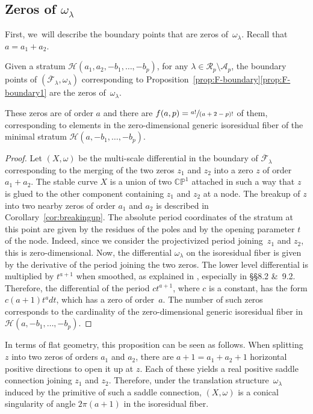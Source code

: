 \subsection{Zeros of $\omega_{\lambda}$}\label{subsub:zeros}

First, we~will describe the boundary points that are zeros of~$\omega_{\lambda}$. Recall that $a=a_{1}+a_{2}$.
\begin{prop}\label{prop:zeros}
Given a stratum $\mathcal{H}(a_{1},a_{2},-b_{1},\dots,-b_{p})$, for any $\lambda \in \mathcal{R}_{p} \setminus \mathcal{A}_{p}$, the boundary points of $(\overline{\mathcal{F}}_{\lambda}, \omega_\lambda)$ corresponding to Proposition~\ref{prop:F-boundary}\eqref{prop:F-boundary1} are the zeros of~$\omega_{\lambda}$.

These zeros are of order $a$ and there are $f(a,p)=\sfrac{a!}{(a+2-p)!}$ of them, corresponding to elements in the zero-dimensional generic isoresidual fiber of the minimal stratum $\mathcal{H}(a,-b_{1},\dots,-b_{p})$.
\end{prop}

\begin{proof}
Let $(X,\omega)$ be the multi-scale differential in the boundary of $\overline{\mathcal F}_\lambda$ corresponding to the merging of the two zeros $z_1$ and $z_2$ into a zero $z$ of order $a_1 + a_2$. The stable curve $X$ is a union of two $\mathbb{CP}^1$ attached in such a way that $z$ is glued to the other component containing $z_1$ and $z_2$ at a node. The breakup of $z$ into two nearby zeros of order $a_1$ and $a_2$ is described in Corollary~\ref{cor:breakingup}. The absolute period coordinates of the stratum at this point are given by the residues of the poles and by the opening parameter $t$ of the node. Indeed, since we consider the projectivized period joining~$z_{1}$ and $z_{2}$, this is zero-dimensional. Now, the differential $\omega_{\lambda}$ on the isoresidual fiber is given by the derivative of the period joining the two zeros. The lower level differential is multiplied by $t^{a+1}$ when smoothed, as explained in \cite{BCGGM2}, especially in \S\S 8.2 \&~9.2. Therefore, the differential of the period $ct^{a+1}$, where $c$ is a constant, has the form $c(a+1)t^{a}dt$, which has a zero of order~$a$. The number of such zeros corresponds to the cardinality of the zero-dimensional generic isoresidual fiber in $\mathcal{H}(a,-b_{1},\dots,-b_{p})$.
\end{proof}

\begin{rmk}
In terms of flat geometry, this proposition can be seen as follows. When splitting $z$ into two zeros of orders $a_{1}$ and $a_{2}$, there are $a +1 = a_1 + a_2 + 1$ horizontal positive directions to open it up at $z$. Each of these yields a real positive saddle connection joining $z_1$ and $z_2$. Therefore, under the translation structure~$\omega_\lambda$ induced by the primitive of such a saddle connection, $(X,\omega)$ is a conical singularity of angle $2\pi (a+1)$ in the isoresidual fiber.
\end{rmk}

